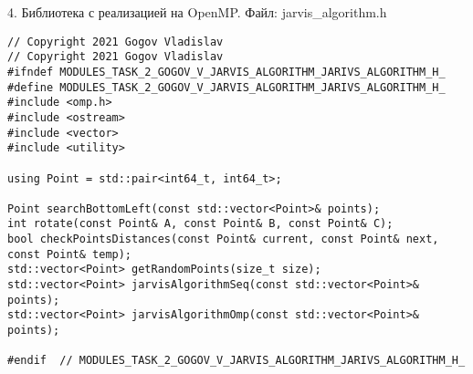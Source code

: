 \documentclass{report}
\begin{document}
\par 4. Библиотека с реализацией на OpenMP. Файл: jarvis\_algorithm.h
\begin{lstlisting}
// Copyright 2021 Gogov Vladislav
// Copyright 2021 Gogov Vladislav
#ifndef MODULES_TASK_2_GOGOV_V_JARVIS_ALGORITHM_JARIVS_ALGORITHM_H_
#define MODULES_TASK_2_GOGOV_V_JARVIS_ALGORITHM_JARIVS_ALGORITHM_H_
#include <omp.h>
#include <ostream>
#include <vector>
#include <utility>

using Point = std::pair<int64_t, int64_t>;

Point searchBottomLeft(const std::vector<Point>& points);
int rotate(const Point& A, const Point& B, const Point& C);
bool checkPointsDistances(const Point& current, const Point& next, const Point& temp);
std::vector<Point> getRandomPoints(size_t size);
std::vector<Point> jarvisAlgorithmSeq(const std::vector<Point>& points);
std::vector<Point> jarvisAlgorithmOmp(const std::vector<Point>& points);

#endif  // MODULES_TASK_2_GOGOV_V_JARVIS_ALGORITHM_JARIVS_ALGORITHM_H_
\end{lstlisting}
\end{document}
